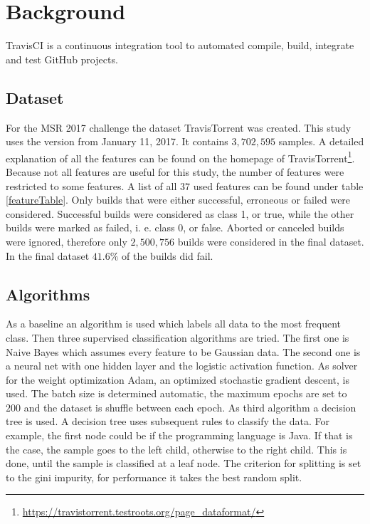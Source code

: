 \documentclass[a4paper,11pt]{article}
\begin{document}
\section{Background}

TravisCI is a continuous integration tool to automated compile, build, integrate and test GitHub projects. 

\subsection{Dataset}

For the MSR 2017 challenge the dataset TravisTorrent\cite{msr17challenge} was created. This study uses the version from January 11, 2017. It contains $3,702,595$ samples. A detailed explanation of all the features can be found on the homepage of TravisTorrent\footnote{\url{https://travistorrent.testroots.org/page_dataformat/}}. Because not all features are useful for this study, the number of features were restricted to some features. A list of all $37$ used features can be found under table \ref{featureTable}. Only builds that were either successful, erroneous or failed were considered. Successful builds were considered as class 1, or true, while the other builds were marked as failed, i. e. class 0, or false. Aborted or canceled builds were ignored, therefore only $2,500,756$ builds were considered in the final dataset. In the final dataset $41.6\%$ of the builds did fail. 


\subsection{Algorithms}

As a baseline an algorithm is used which labels all data to the most frequent class. Then three supervised classification algorithms are tried. 
The first one is Naive Bayes which assumes every feature to be Gaussian data. 
The second one is a neural net with one hidden layer and the logistic activation function. As solver for the weight optimization Adam\cite{adam}, an optimized stochastic gradient descent, is used. The batch size is determined automatic, the maximum epochs are set to $200$ and the dataset is shuffle between each epoch.
As third algorithm a decision tree is used. A decision tree uses subsequent rules to classify the data. For example, the first node could be if the programming language is Java. If that is the case, the sample goes to the left child, otherwise to the right child. This is done, until the sample is classified at a leaf node. The criterion for splitting is set to the gini impurity, for performance it takes the best random split. 
\end{document}

